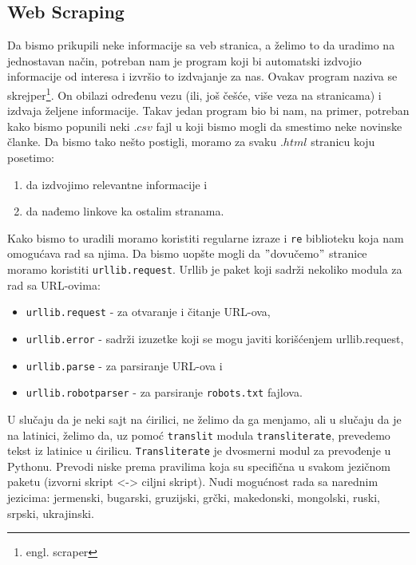 \documentclass[a4paper]{article}
\begin{document}
\subsection{Web Scraping} 
Da bismo prikupili neke informacije sa veb stranica, a želimo to da uradimo na jednostavan način, potreban nam je program koji bi automatski izdvojio informacije od interesa i izvršio to izdvajanje za nas. Ovakav program naziva se skrejper\footnote{engl. scraper}. On obilazi određenu vezu (ili, još češće, više veza na stranicama) i izdvaja željene informacije. Takav jedan program bio bi nam, na primer, potreban kako bismo popunili neki $.csv$ fajl u koji bismo mogli da smestimo neke novinske članke. Da bismo tako nešto postigli, moramo za svaku $.html$ stranicu koju posetimo:
\begin{enumerate}
\item da izdvojimo relevantne informacije i
\item da nađemo linkove ka ostalim stranama.
\end{enumerate}
Kako bismo to uradili moramo koristiti regularne izraze i \texttt{re} biblioteku koja nam omogućava rad sa njima. Da bismo uopšte mogli da $"$dovučemo$"$ stranice moramo koristiti \texttt{urllib.request}. 
Urllib je paket koji sadrži nekoliko modula za rad sa URL-ovima:
\begin{itemize}
\item \texttt{urllib.request} - za otvaranje i čitanje URL-ova,
\item \texttt{urllib.error} - sadrži izuzetke koji se mogu javiti korišćenjem urllib.request,
\item \texttt{urllib.parse} - za parsiranje URL-ova i 
\item \texttt{urllib.robotparser} - za parsiranje \texttt{robots.txt} fajlova.
\end{itemize}
U slučaju da je neki sajt na ćirilici, ne želimo da ga menjamo, ali u slučaju da je na latinici, želimo da, uz pomoć \texttt{translit} modula \texttt{transliterate}, prevedemo tekst iz latinice u ćirilicu. \texttt{Transliterate} je dvosmerni modul za prevođenje u Pythonu. Prevodi niske prema pravilima koja su specifična u svakom jezičnom paketu (izvorni skript <-> ciljni skript). Nudi mogućnost rada sa narednim jezicima: jermenski, bugarski, gruzijski, grčki, makedonski, mongolski, ruski, srpski, ukrajinski.  
\end{document}
